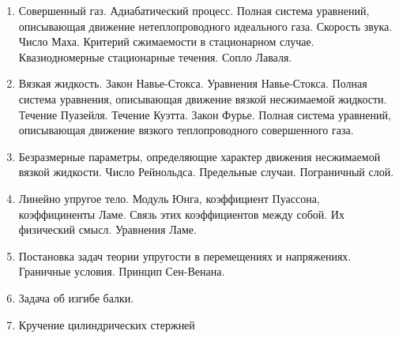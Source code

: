 \documentclass[specialist, subf, href, colorlinks=true, 14pt, times, mtpro, final]{report}
\theoremstyle{definition}
\begin{document}
\begin{enumerate}
  \item Совершенный газ. Адиабатический процесс. Полная система уравнений, описывающая движение нетеплопроводного идеального газа. Скорость звука. Число Маха. Критерий сжимаемости в стационарном случае. Квазиодномерные стационарные течения. Сопло Лаваля.
  \item Вязкая жидкость. Закон Навье-Стокса. Уравнения Навье-Стокса. Полная система уравнения, описывающая движение вязкой несжимаемой жидкости. Течение Пуазейля. Течение Куэтта. Закон Фурье. Полная система уравнений, описывающая движение вязкого теплопроводного совершенного газа.
  \item Безразмерные параметры, определяющие характер движения несжимаемой вязкой жидкости. Число Рейнольдса. Предельные случаи. Пограничный слой.
  \item Линейно упругое тело. Модуль Юнга, коэффициент Пуассона, коэффициненты Ламе. Связь этих коэффициентов между собой. Их физический смысл. Уравнения Ламе.
  \item Постановка задач теории упругости в перемещениях и напряжениях. Граничные условия. Принцип Сен-Венана.
  \item Задача об изгибе балки.
  \item Кручение цилиндрических стержней
\end{enumerate}
\end{document}
